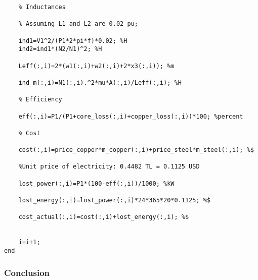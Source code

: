\begin{verbatim}
    % Inductances

    % Assuming L1 and L2 are 0.02 pu;

    ind1=V1^2/(P1*2*pi*f)*0.02; %H
    ind2=ind1*(N2/N1)^2; %H

    Leff(:,i)=2*(w1(:,i)+w2(:,i)+2*x3(:,i)); %m

    ind_m(:,i)=N1(:,i).^2*mu*A(:,i)/Leff(:,i); %H

    % Efficiency

    eff(:,i)=P1/(P1+core_loss(:,i)+copper_loss(:,i))*100; %percent

    % Cost

    cost(:,i)=price_copper*m_copper(:,i)+price_steel*m_steel(:,i); %$

    %Unit price of electricity: 0.4482 TL = 0.1125 USD

    lost_power(:,i)=P1*(100-eff(:,i))/1000; %kW

    lost_energy(:,i)=lost_power(:,i)*24*365*20*0.1125; %$

    cost_actual(:,i)=cost(:,i)+lost_energy(:,i); %$


    i=i+1;
end
\end{verbatim}


\subsubsection*{Conclusion}

